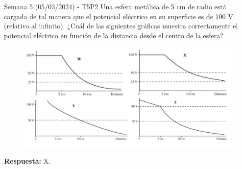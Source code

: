 \begin{frame}{Semana 5 (05/03/2024) - T5P2}
    Una esfera metálica de 5 cm de radio está cargada de tal manera que el potencial el\'ectrico en su superficie es de 100 V (relativo al infinito). ¿Cuál de las siguientes gráficas muestra correctamente el potencial el\'ectrico en función de la distancia desde el centro de la esfera?
    
    \vspace{-2em}
    
    \begin{figure}
        \centering
        \includegraphics[scale=0.3]{figures/t5p2.png}
    \end{figure}
    
    \pause \begin{center}
        \textbf{Respuesta:} X.
    \end{center}
    
\end{frame}



